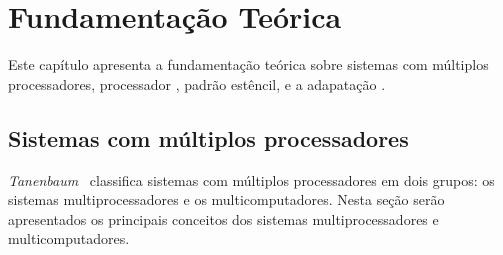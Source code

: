 
%


\chapter{Fundamentação Teórica}
\label{cap:fundamentacao_teorica}


Este capítulo apresenta a fundamentação teórica sobre sistemas com múltiplos processadores, processador \manycore \mppa, padrão estêncil, \fw \pskel e a adapatação \pskelmppa.

\section{Sistemas com múltiplos processadores}
\label{sec:multicpu}

\textit{Tanenbaum}~\cite{Tanenbaum:2014:MOS:2655363} classifica sistemas com múltiplos processadores em dois grupos: os sistemas multiprocessadores e os multicomputadores. Nesta seção serão apresentados os principais conceitos dos sistemas multiprocessadores e multicomputadores.

